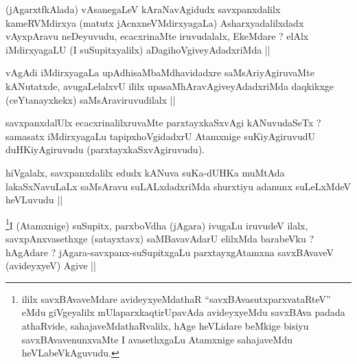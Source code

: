 \begin{artha}
(jAgarxtfkAlada) vAsanegaLeV kAraNavAgidudx savxpanxdalilx kameRVMdirxya (matutx jAcnxneVMdirxyagaLa) Asharxyadalilxdadx vAyxpAravu neDeyuvudu, ecacxrinaMte iruvudalalx, EkeMdare ? elAlx iMdirxyagaLU (I suSupitxyalilx) aDagihoVgiveyAdadxriMda ||
\end{artha}

\begin{artha}
vAgAdi iMdirxyagaLa upAdhisaMbaMdhavidadxre saMsAriyAgiruvaMte kANutatxde, avugaLelalxvU ililx upasaMhAravAgiveyAdadxriMda daqkikxge (ceYtanayxkekx) saMsAraviruvudilalx ||
\end{artha}


\begin{artha}
savxpanxdalUlx ecacxrinalilxruvaMte parxtayxkaSxvAgi kANuvudaSeTx ? samasatx iMdirxyagaLu tapipxhoVgidadxrU Atamxnige suKiyAgiruvudU duHKiyAgiruvudu (parxtayxkaSxvAgiruvudu).
\end{artha}


\begin{artha}
hiVgalalx, savxpanxdalilx edudx kANuva suKa-dUHKa muMtAda lakaSxNavuLaLx saMsAravu suLALxdadxriMda shurxtiyu adanunx suLeLxMdeV heVLuvudu ||
\end{artha}


\begin{artha}
\footnote{ililx savxBAvaveMdare avideyxyeMdathaR ``savxBAvasutxparxvataRteV'' eMdu giVgeyalilx mUlaparxkaqtirUpavAda avideyxyeMdu savxBAva padada athaRvide, sahajaveMdathaRvalilx, hAge heVLidare beMkige bisiyu savxBAvavenunxvaMte I avasethxgaLu Atamxnige sahajaveMdu heVLabeVkAguvudu.}I (Atamxnige) suSupitx, parxboVdha (jAgara) ivugaLu iruvudeV ilalx, savxpAnxvasethxge (satayxtavx) saMBavavAdarU elilxMda barabeVku ? hAgAdare ? jAgara-savxpanx-suSupitxgaLu parxtayxgAtamxna savxBAvaveV (avideyxyeV) Agive ||
\end{artha}


